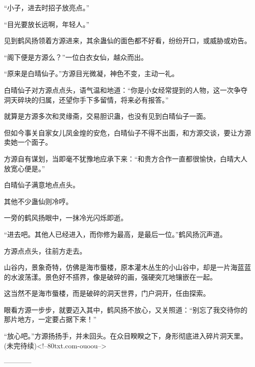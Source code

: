 \begin{this_body}
“小子，进去时招子放亮点。”

“目光要放长远啊，年轻人。”

见到鹤风扬领着方源进来，其余蛊仙的面色都不好看，纷纷开口，或威胁或劝告。

“阁下便是方源么？”一位白衣女仙，越众而出。

“原来是白晴仙子。”方源目光微凝，神色不变，主动一礼。

白晴仙子对方源点点头，语气温和地道：“你是小女经常提到的人物，这一次争夺洞天碎块的归属，还望你手下多留情，将来必有报答。”

就算是方源多次和灵缘斋，交易胆识蛊，也没有见到白晴仙子一面。

但如今事关自家女儿凤金煌的安危，白晴仙子不得不出面，和方源交谈，要让方源卖她一个面子。

方源自有谋划，当即毫不犹豫地应承下来：“和贵方合作一直都很愉快，白晴大人放宽心便是。”

白晴仙子满意地点点头。

其他不少蛊仙则冷哼。

一旁的鹤风扬眼中，一抹冷光闪烁即逝。

“进去吧。其他人已经进入，而你修为最高，是最后一位。”鹤风扬沉声道。

方源点点头，往前方走去。

山谷内，景象奇特，仿佛是海市蜃楼，原本灌木丛生的小山谷中，却是一片海蓝蓝的水波荡漾。景色好不搭界，像是破碎的画，强硬突兀地镶嵌在一起。

这当然不是海市蜃楼，而是破碎的洞天世界，门户洞开，任由探索。

眼看方源一步步，就要迈入其中，鹤风扬不放心，又关照道：“别忘了我交待你的那片地方，一定要占据下来！”

“放心吧。”方源扬扬手，并未回头。在众目睽睽之下，身形彻底进入碎片洞天里。(未完待续)<!--80txt.com-ouoou-->

------------

\end{this_body}

